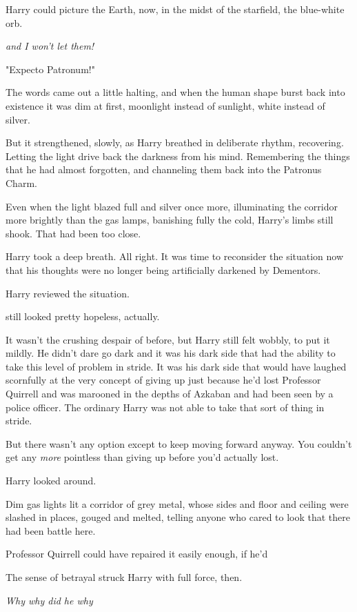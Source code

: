 Harry could picture the Earth, now, in the midst of the starfield, the
blue-white orb.

\emph{{\el}and I won't let them!}

"Expecto Patronum!"

The words came out a little halting, and when the human shape burst back into
existence it was dim at first, moonlight instead of sunlight, white instead of
silver.

But it strengthened, slowly, as Harry breathed in deliberate rhythm,
recovering. Letting the light drive back the darkness from his mind.
Remembering the things that he had almost forgotten, and channeling them back
into the Patronus Charm.

Even when the light blazed full and silver once more, illuminating the corridor
more brightly than the gas lamps, banishing fully the cold, Harry's limbs still
shook. That had been too close.

Harry took a deep breath. All right. It was time to reconsider the situation
now that his thoughts were no longer being artificially darkened by Dementors.

Harry reviewed the situation.

{\el} still looked pretty hopeless, actually.

It wasn't the crushing despair of before, but Harry still felt wobbly, to put
it mildly. He didn't dare go dark and it was his dark side that had the ability
to take this level of problem in stride. It was his dark side that would have
laughed scornfully at the very concept of giving up just because he'd lost
Professor Quirrell and was marooned in the depths of Azkaban and had been seen
by a police officer. The ordinary Harry was not able to take that sort of thing
in stride.

But there wasn't any option except to keep moving forward anyway. You couldn't
get any \emph{more} pointless than giving up before you'd actually lost.

Harry looked around.

Dim gas lights lit a corridor of grey metal, whose sides and floor and ceiling
were slashed in places, gouged and melted, telling anyone who cared to look
that there had been battle here.

Professor Quirrell could have repaired it easily enough, if he'd{\el}

The sense of betrayal struck Harry with full force, then.

\emph{Why{\el} why did he{\el} why{\el}}

